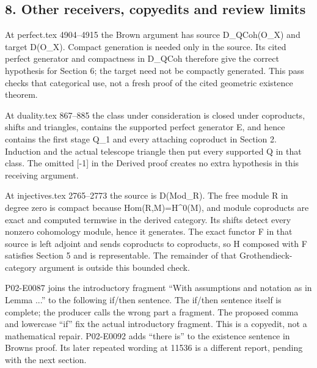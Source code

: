 \documentclass[11pt]{article}
\begin{document}
\subsection{\texorpdfstring{8. Other receivers,\allowbreak{} copyedits and review limits}{8. Other  copyedits and review limits}}\label{proofs-11121-11450-other-receivers-copyedits-and-review-limits}

At perfect.tex 4904–\allowbreak{}4915 the Brown argument has source D\_\allowbreak{}QCoh(O\_\allowbreak{}X)\allowbreak{} and target D(O\_\allowbreak{}X)\allowbreak{}. Compact generation is needed only in the source. Its cited perfect generator and compactness in D\_\allowbreak{}QCoh therefore give the correct hypothesis for Section 6; the target need not be compactly generated. This pass checks that categorical use,\allowbreak{} not a fresh proof of the cited geometric existence theorem.

At duality.tex 867–\allowbreak{}885 the class under consideration is closed under coproducts,\allowbreak{} shifts and triangles,\allowbreak{} contains the supported perfect generator E,\allowbreak{} and hence contains the first stage Q\_\allowbreak{}1 and every attaching coproduct in Section 2. Induction and the actual telescope triangle then put every supported Q in that class. The omitted [-1]\allowbreak{} in the Derived proof creates no extra hypothesis in this receiving argument.

At injectives.tex 2765–\allowbreak{}2773 the source is D(Mod\_\allowbreak{}R)\allowbreak{}. The free module R in degree zero is compact because Hom(R,\allowbreak{}M)\allowbreak{}\allowbreak{}=H\textasciicircum{}0(M)\allowbreak{},\allowbreak{} and module coproducts are exact and computed termwise in the derived category. Its shifts detect every nonzero cohomology module,\allowbreak{} hence it generates. The exact functor F in that source is left adjoint and sends coproducts to coproducts,\allowbreak{} so H composed with F satisfies Section 5 and is representable. The remainder of that Grothendieck-category argument is outside this bounded check.

P02-E0087 joins the introductory fragment ``With assumptions and notation as in Lemma ...'' to the following if/\allowbreak{}then sentence. The if/\allowbreak{}then sentence itself is complete; the producer calls the wrong part a fragment. The proposed comma and lowercase ``if'' fix the actual introductory fragment. This is a copyedit,\allowbreak{} not a mathematical repair. P02-E0092 adds ``there is'' to the existence sentence in Brown\textquotesingle s proof. Its later repeated wording at 11536 is a different report,\allowbreak{} pending with the next section.
\end{document}
